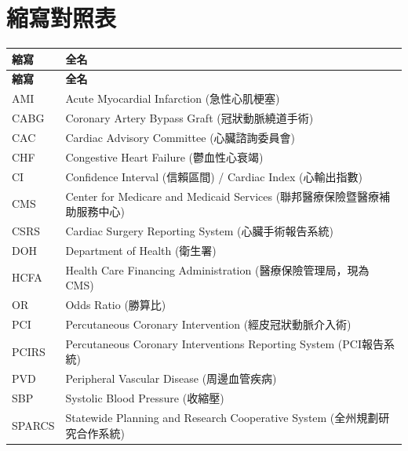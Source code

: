 \documentclass[12pt,a4paper]{article}
\begin{document}
\section{縮寫對照表}

\begin{longtable}{p{3cm}p{11cm}}
\toprule
\textbf{縮寫} & \textbf{全名} \\
\midrule
\endfirsthead

\toprule
\textbf{縮寫} & \textbf{全名} \\
\midrule
\endhead

\bottomrule
\endfoot

AMI & Acute Myocardial Infarction (急性心肌梗塞) \\
CABG & Coronary Artery Bypass Graft (冠狀動脈繞道手術) \\
CAC & Cardiac Advisory Committee (心臟諮詢委員會) \\
CHF & Congestive Heart Failure (鬱血性心衰竭) \\
CI & Confidence Interval (信賴區間) / Cardiac Index (心輸出指數) \\
CMS & Center for Medicare and Medicaid Services (聯邦醫療保險暨醫療補助服務中心) \\
CSRS & Cardiac Surgery Reporting System (心臟手術報告系統) \\
DOH & Department of Health (衛生署) \\
HCFA & Health Care Financing Administration (醫療保險管理局，現為CMS) \\
OR & Odds Ratio (勝算比) \\
PCI & Percutaneous Coronary Intervention (經皮冠狀動脈介入術) \\
PCIRS & Percutaneous Coronary Interventions Reporting System (PCI報告系統) \\
PVD & Peripheral Vascular Disease (周邊血管疾病) \\
SBP & Systolic Blood Pressure (收縮壓) \\
SPARCS & Statewide Planning and Research Cooperative System (全州規劃研究合作系統) \\
\bottomrule
\end{longtable}
\end{document}

